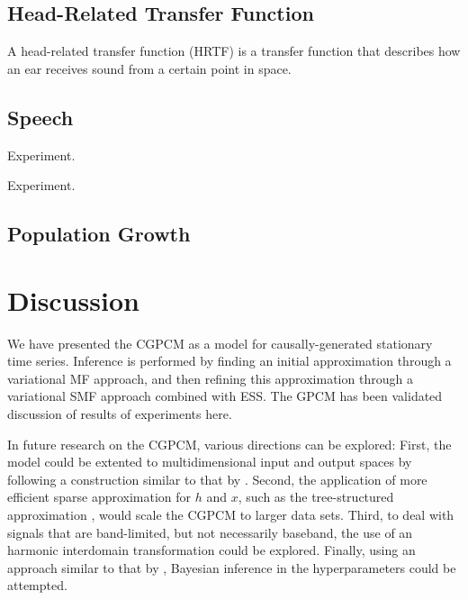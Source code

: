 \documentclass{article}
\begin{document}


\subsection{Head-Related Transfer Function}
A head-related transfer function (HRTF) is a transfer function that describes how an ear receives sound from a certain point in space.

\subsection{Speech}

{\color{red} Experiment.}


{\color{red} Experiment.}

\subsection{Population Growth}

\section{Discussion}
We have presented the CGPCM as a model for causally-generated stationary time series. Inference is performed by finding an initial approximation through a variational MF approach, and then refining this approximation through a variational SMF approach combined with ESS. The GPCM has been validated {\color{red} discussion of results of experiments here.}

In future research on the CGPCM, various directions can be explored: First, the model could be extented to multidimensional input and output spaces by following a construction similar to that by \citet{Bruinsma:2016:GGPCM}. Second, the application of more efficient sparse approximation for $h$ and $x$, such as the tree-structured approximation \cite{Bui:2014:Tree-Structured_Gaussian}, would scale the CGPCM to larger data sets. Third, to deal with signals that are band-limited, but not necessarily baseband, the use of an harmonic interdomain transformation \cite{Tobar:2015:Inter-Domain_Inducing} could be explored.
Finally, using an approach similar to that by \citet{Lazaro-Gredilla:2013:Variational_Inference_for_Mahalanobis_Distance}, Bayesian inference in the hyperparameters could be attempted.
\end{document}
